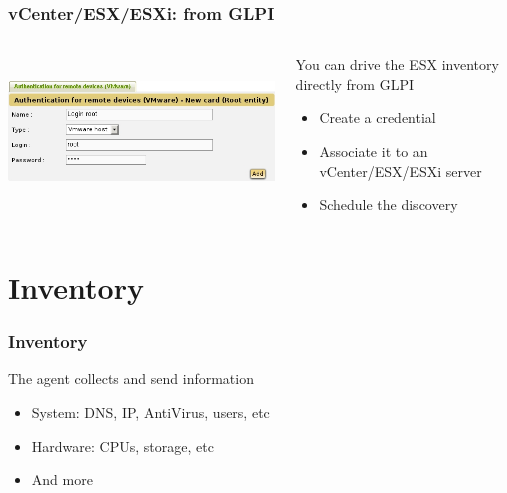 \documentclass{beamer}
\begin{document}
\begin{frame}[fragile]
    \frametitle{vCenter/ESX/ESXi: from GLPI}

 \begin{columns}
 \begin{column}[T]{4cm}
    \includegraphics[height=4.0cm]{pics/esx-glpi.jpg}
 \end{column}
 \begin{column}[t]{6cm}
    \begin{block}{You can drive the ESX inventory directly from GLPI}
    \begin{itemize}
         \item Create a credential
         \item Associate it to an vCenter/ESX/ESXi server 
         \item Schedule the discovery
    \end{itemize}
    \end{block}
 \end{column}
\end{columns}




\end{frame}



\section{Inventory}

\begin{frame}
    \frametitle{Inventory}

    \begin{block}{The agent collects and send information}
        \begin{itemize}
            \item System: DNS, IP, AntiVirus, users, etc
            \item Hardware: CPUs, storage, etc
            \item And more
        \end{itemize}
    \end{block}
\end{frame}
\end{document}
